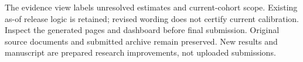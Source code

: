 \documentclass[11pt,a4paper]{article}
\begin{document}
The evidence view labels unresolved estimates and current-cohort scope. Existing as-of release logic is retained; revised wording does not certify current calibration. Inspect the generated pages and dashboard before final submission. Original source documents and submitted archive remain preserved. New results and manuscript are prepared research improvements, not uploaded submissions.\par
\end{document}
